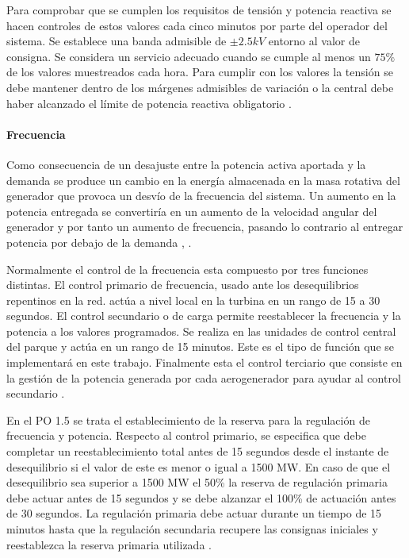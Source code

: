 \documentclass{book}
\begin{document}
Para comprobar que se cumplen los requisitos de tensi\'on y potencia reactiva se hacen controles de estos valores cada cinco minutos por parte del operador del sistema. Se establece una banda admisible de $\pm2.5 kV$ entorno al valor de consigna. Se considera un servicio adecuado cuando se cumple al menos un $75\%$ de los valores muestreados cada hora. Para cumplir con los valores la tensi\'on  se debe mantener dentro de los m\'argenes admisibles de variaci\'on o la central debe haber alcanzado el l\'imite de potencia reactiva obligatorio \cite{PO74}. \par

		\paragraph{Frecuencia}
Como consecuencia de un desajuste entre la potencia activa aportada y la demanda se produce un cambio en la energía almacenada en la masa rotativa del generador que provoca un desv\'io de la frecuencia del sistema. Un aumento en la potencia entregada se convertir\'ia en un aumento de la velocidad angular del generador y por tanto un aumento de frecuencia, pasando lo contrario al entregar potencia por debajo de la demanda \cite{WFgridcode}, \cite{FrecuencyLvL}. \par

Normalmente el control de la frecuencia esta compuesto por tres funciones distintas. El control primario de frecuencia, usado ante los desequilibrios repentinos en la red. act\'ua a nivel local en la turbina en un rango de 15 a 30 segundos. El control secundario o de carga permite reestablecer la frecuencia y la potencia a los valores programados. Se realiza en las unidades de control central del parque y act\'ua en un rango de 15 minutos. Este es el tipo de funci\'on que se implementar\'a en este trabajo. Finalmente esta el control terciario que consiste en la gesti\'on de la potencia generada por cada aerogenerador para ayudar al control secundario \cite{WFgridcode}. \par

En el PO 1.5 se trata el establecimiento de la reserva para la regulaci\'on de frecuencia y potencia. Respecto al control primario, se especifica que debe completar un reestablecimiento total antes de 15 segundos desde el instante de desequilibrio si el valor de este es menor o igual a 1500 MW. En caso de que el desequilibrio sea superior a 1500 MW el 50\% la reserva de regulaci\'on primaria debe actuar antes de 15 segundos y se debe alzanzar el 100\% de actuaci\'on antes de 30 segundos. La regulaci\'on primaria debe actuar durante un tiempo de 15 minutos hasta que la regulaci\'on secundaria recupere las consignas iniciales y reestablezca la reserva primaria utilizada \cite{PO15}. \par
\end{document}
